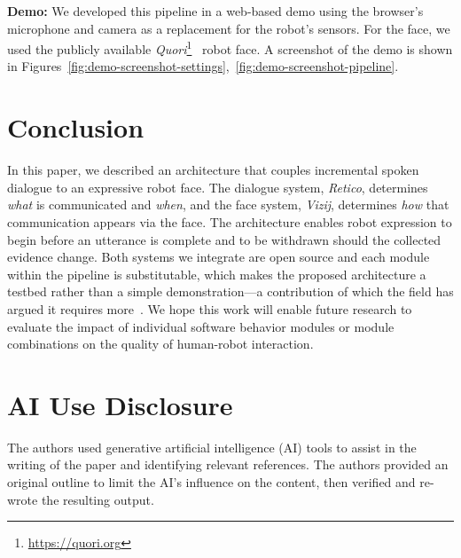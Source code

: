 \documentclass[conference]{IEEEtran}
\begin{document}
\textbf{Demo:} We developed this pipeline in a web-based demo using the browser's microphone and camera as a replacement for the robot's sensors. For the face, we used the publicly available \textit{Quori}\footnote{\url{https://quori.org}}~\cite{specian2021quori} robot face. A screenshot of the demo is shown in Figures~\ref{fig:demo-screenshot-settings},~\ref{fig:demo-screenshot-pipeline}. %


\section{Conclusion}

In this paper, we described an architecture that couples incremental spoken dialogue to
an expressive robot face. The dialogue system, \textit{Retico}, determines \textit{what} is communicated
and \textit{when}, and the face system, \textit{Vizij}, determines \textit{how} that communication appears via the face. The architecture enables robot expression to begin before an utterance is complete and to be withdrawn should the collected evidence change. Both systems we integrate are open source and each module within the pipeline is substitutable, which makes the proposed architecture a testbed rather than a simple demonstration---a
contribution of which the field has argued it requires more~\cite{gunes2022reproducibility}. We hope this work will enable future research to evaluate the impact of individual software behavior modules or module combinations on the quality of human-robot interaction.



\section*{AI Use Disclosure}
The authors used generative artificial intelligence (AI) tools to assist in the writing of the paper and identifying relevant references. The authors provided an original outline to limit the AI's influence on the content, then verified and re-wrote the resulting output.








\end{document}
